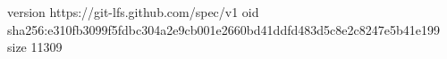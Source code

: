 version https://git-lfs.github.com/spec/v1
oid sha256:e310fb3099f5fdbc304a2e9cb001e2660bd41ddfd483d5c8e2c8247e5b41e199
size 11309
